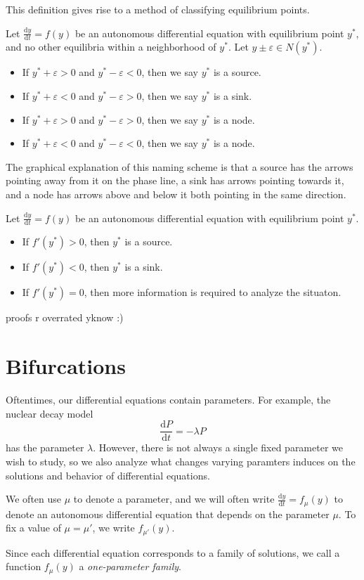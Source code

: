 This definition gives rise to a method of classifying equilibrium points.
\begin{definition}\label{dfn:6}
	Let $\frac{\mathrm{d}y}{\mathrm{d}t} =f(y)$ be an autonomous differential equation with equilibrium point $y^*$, and no other equilibria within a neighborhood of $y^*$. Let $y\pm\varepsilon \in N(y^*)$.
	\begin{itemize}
		\item If $y^*+\varepsilon >0$ and $y^*-\varepsilon <0$, then we say $y^*$ is a source.
		\item If $y^*+\varepsilon <0$ and $y^*-\varepsilon >0$, then we say $y^*$ is a sink.
		\item If $y^*+\varepsilon >0$ and $y^*-\varepsilon >0$, then we say $y^*$ is a node.
		\item If $y^*+\varepsilon <0$ and $y^*-\varepsilon <0$, then we say $y^*$ is a node.
	\end{itemize}
\end{definition}
The graphical explanation of this naming scheme is  that a source has the arrows pointing away from it on the phase line, a sink has arrows pointing towards it, and a node has arrows above and below it both pointing in the same direction.
\begin{theorem}[Linearization]\label{thm:4}
	Let $\frac{\mathrm{d}y}{\mathrm{d}t} =f(y)$ be an autonomous differential equation with equilibrium point $y^*$. 
	\begin{itemize}
		\item If $f'(y^*)>0$, then $y^*$ is a source.
		\item If $f'(y^*)<0$, then $y^*$ is a sink.
		\item If $f'(y^*)=0$, then more information is required to analyze the situaton.
	\end{itemize}
\end{theorem}
proofs r overrated yknow :)
\section{Bifurcations}
Oftentimes, our differential equations contain parameters. For example, the nuclear decay model
\[
	\frac{\mathrm{d}P}{\mathrm{d}t} =-\lambda P
\]
has the parameter $\lambda $. However, there is not always a single fixed parameter we wish to study, so we also analyze what changes varying paramters induces on the solutions and behavior of differential equations.
\begin{notation}
	We often use $\mu $ to denote a parameter, and we will often write $\frac{\mathrm{d}y}{\mathrm{d}t} =f_\mu (y)$ to denote an autonomous differential equation that depends on the parameter $\mu $. To fix a value of $\mu =\mu '$, we write $f_{\mu '}(y)$.
\end{notation}
Since each differential equation corresponds to a family of solutions, we call a function $f_\mu (y)$ a \emph{one-parameter family}.

